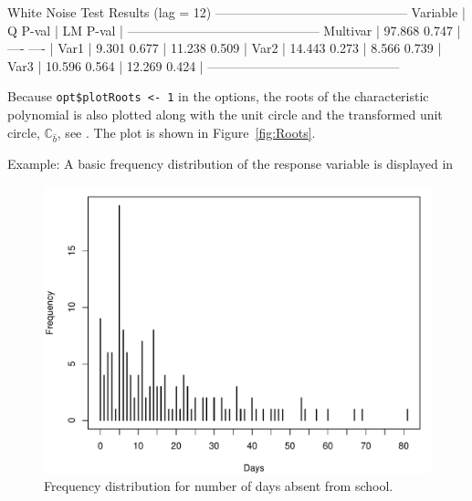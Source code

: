 \documentclass[article]{jss}
\begin{document}
\begin{CodeChunk} 
\begin{CodeOutput}
       White Noise Test Results (lag = 12)
---------------------------------------------
Variable |       Q  P-val |      LM  P-val  |
---------------------------------------------
Multivar |  97.868  0.747 |     ----  ----  |
Var1     |   9.301  0.677 |  11.238  0.509  |
Var2     |  14.443  0.273 |   8.566  0.739  |
Var3     |  10.596  0.564 |  12.269  0.424  |
---------------------------------------------
\end{CodeOutput}
\end{CodeChunk} 

Because \verb|opt$plotRoots <- 1| in the options, 
the roots of the characteristic polynomial is also plotted along with the unit circle and the transformed unit circle, $\mathbb{C}_{\hat{b}}$, see \cite{Johansen2008}. 
The plot is shown in Figure~\ref{fig:Roots}.

Example: A basic frequency distribution of the response variable is displayed in

\begin{figure}[t!]
\centering
\includegraphics{delete-this-image}
\caption{\label{fig:quine} Frequency distribution for number of days absent
from school.}
\end{figure}
\end{document}
